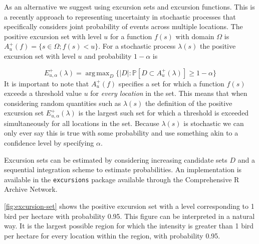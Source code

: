 \documentclass[preprint,12pt]{elsarticle}
\DeclareMathOperator*{\argmax}{arg\,max}  %
\begin{document}
As an alternative we suggest using excursion sets and excursion functions.  This is a recently approach to representing uncertainty in stochastic processes that specifically considers
joint probability of events across multiple locations.  The positive excursion set with level $u$ for a function $f(s)$ with domain $\Omega$ is $A_u^{+}(f) = \{ s \in \Omega ; f(s) < u \}$.  For a stochastic process $\lambda(s)$ the positive excursion set with level $u$ and probability $1 - \alpha$ is 

\begin{equation*}
E_{u,\alpha}^{+}(\lambda) = \argmax_{D}\{\lvert D \rvert : \mathbb{P}\left[D \subset A_u^{+}(\lambda)\right] \geq 1 - \alpha \}
\end{equation*}
It is important to note that $A_u^{+}(f)$ specifies a set for which a function $f(s)$ exceeds a threshold value $u$ for \textit{every location} in the set.  This means that when considering random quantities such as $\lambda(s)$ the definition of the positive excursion set $E_{u,\alpha}^{+}(\lambda)$ is the largest such set for which a threshold is exceeded simultaneously for all locations in the set.  Because $\lambda(s)$ is stochastic we can only ever say this is true with some probability and use something akin to a confidence level by specifying $\alpha$.  

Excursion sets can be estimated by considering increasing candidate sets $D$ and a sequential integration scheme to estimate probabilities.  An implementation is available in the \texttt{excursions} package available through the Comprehensive R Archive Network.  

\autoref{fig:excursion-set} shows the positive excursion set with a level corresponding to 1 bird per hectare with probability 0.95.  This figure can be interpreted in a natural way.  It is the largest possible region for which the intensity is greater than 1 bird per hectare for every location within the region, with probability 0.95.  
\end{document}
